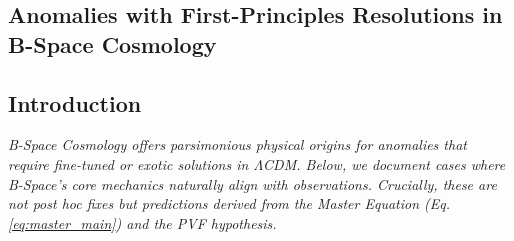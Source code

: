 \documentclass{BSpacePaper} %
\begin{document}
\begin{appendices}
\clearpage

\section{Anomalies with First-Principles Resolutions in B-Space Cosmology}
\label{app:anomalies}
\setcounter{equation}{0}
\setcounter{table}{0}
\setcounter{figure}{0}

\subsection*{Introduction}
\small\textit{B-Space Cosmology offers parsimonious physical origins for anomalies that require fine-tuned or exotic solutions in \(\Lambda\)CDM. Below, we document cases where B-Space's core mechanics naturally align with observations. Crucially, these are not post hoc fixes but predictions derived from the Master Equation (Eq. \ref{eq:master_main}) and the PVF hypothesis.}


\end{appendices}
\end{document}
